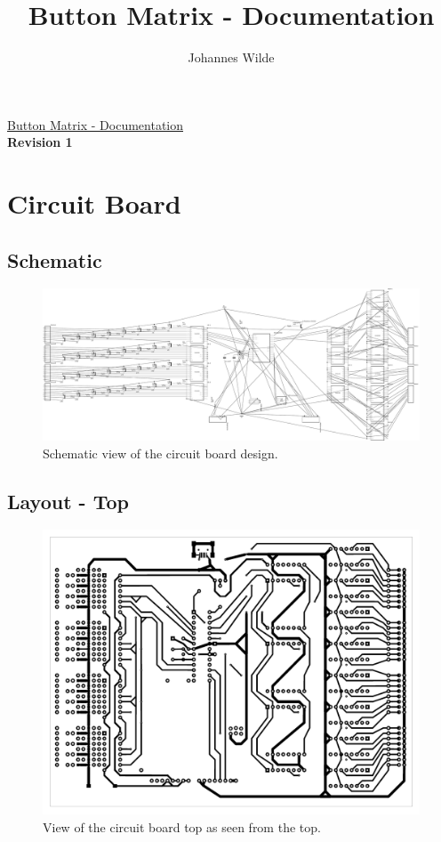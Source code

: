 \documentclass[english, parskip=half-, 11pt]{scrartcl}
\title{Button Matrix - Documentation}
\author{Johannes Wilde}
\begin{document}
\begin{center}
	\Huge \underline{Button Matrix - Documentation}\\
	{\normalsize \textbf{Revision 1}}
\end{center}

\vspace*{-1cm}

\section{Circuit Board}

\subsection{Schematic}

\begin{figure}[H]
	\centering
	\includegraphics[width=\textwidth]{./Images/201902_GameBoard_schem-v1.pdf}
	\caption{Schematic view of the circuit board design.}
	\label{fig:schematic}
\end{figure}
%


\subsection{Layout - Top}

\begin{figure}[H]
	\centering
	\includegraphics[width=.7\textwidth]{./Images/201902_GameBoard_fudged_final1_etch_copper_top.pdf}
	\caption{View of the circuit board top as seen from the top.}
	\label{fig:circuitTop}
\end{figure}
\end{document}

